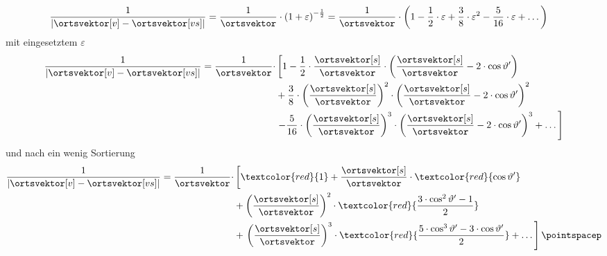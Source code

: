 \begin{frame}

  \begin{align*}
	\dfrac{1}{\left| \ortsvektor[v] - \ortsvektor[vs] \right|}
		&= \dfrac{1}{\ortsvektor} \cdot \left( 1 + \varepsilon \right)^{-\frac{1}{2}} = \dfrac{1}{\ortsvektor} \cdot \left( 1 - \dfrac{1}{2} \cdot \varepsilon + \dfrac{3}{8} \cdot \varepsilon^2 - \dfrac{5}{16} \cdot \varepsilon + \dots \right)
\end{align*}
mit eingesetztem \(\varepsilon\)
\begin{equation*}
	\begin{split}
		\dfrac{1}{\left| \ortsvektor[v] - \ortsvektor[vs] \right|}
			= \dfrac{1}{\ortsvektor} \cdot &\left[ 1
			- \dfrac{1}{2} \cdot \dfrac{\ortsvektor[s]}{\ortsvektor} \cdot \left( \dfrac{\ortsvektor[s]}{\ortsvektor} - 2 \cdot \cos \vartheta' \right) \right. \\
			&+ \dfrac{3}{8} \cdot \left( \dfrac{\ortsvektor[s]}{\ortsvektor} \right)^2 \cdot \left( \dfrac{\ortsvektor[s]}{\ortsvektor} - 2 \cdot \cos \vartheta' \right)^2 \\
			&\left. - \dfrac{5}{16} \cdot \left( \dfrac{\ortsvektor[s]}{\ortsvektor} \right)^3 \cdot \left( \dfrac{\ortsvektor[s]}{\ortsvektor} - 2 \cdot \cos \vartheta' \right)^3  + \dots \right]
	\end{split}
\end{equation*}
und nach ein wenig Sortierung
\begin{align*}
	\begin{split}
		\dfrac{1}{\left| \ortsvektor[v] - \ortsvektor[vs] \right|}
			= \dfrac{1}{\ortsvektor} \cdot &\left[ \textcolor{red}{1}
			+ \dfrac{\ortsvektor[s]}{\ortsvektor} \cdot \textcolor{red}{\cos \vartheta'} \right. \\
			&+ \left(\dfrac{\ortsvektor[s]}{\ortsvektor}\right)^2 \cdot \textcolor{red}{\dfrac{3 \cdot \cos^2 \vartheta' - 1}{2}} \\
			&+ \left. \left(\dfrac{\ortsvektor[s]}{\ortsvektor}\right)^3 \cdot \textcolor{red}{\dfrac{5 \cdot \cos^3 \vartheta' - 3 \cdot \cos \vartheta'}{2}}  + \dots \right] \pointspacep
	\end{split}
\end{align*}
\end{frame}
